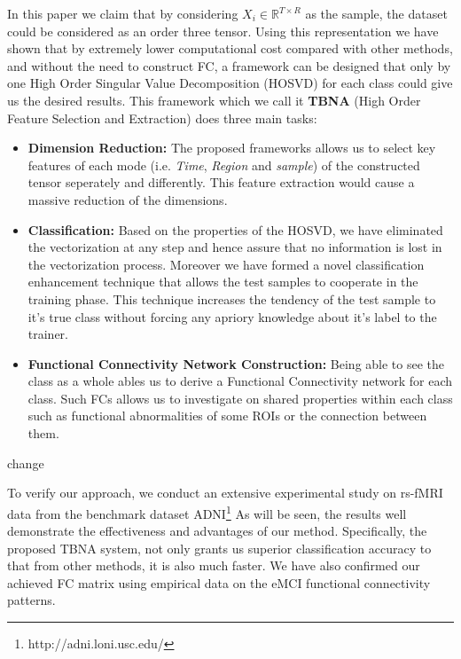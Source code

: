 \documentclass[journal]{IEEEtran}
\begin{document}
	In this paper we claim that by considering $X_i \in \mathbb{R}^ {T \times R}$ as the sample, the dataset could be considered as an order three tensor. Using this representation we have shown that by extremely lower computational cost compared with other methods, and without the need to construct FC, a framework can be designed that only by one High Order Singular Value Decomposition (HOSVD) for each class could give us the desired results. This framework which we call it \textbf{TBNA} (High Order Feature Selection and Extraction) does three main tasks: 
	\begin{itemize}
		\item
		\textbf{Dimension Reduction:}
		The proposed frameworks allows us to select key features of each mode  (i.e. \textit{Time}, \textit{Region} and \textit{sample}) of the constructed tensor seperately and differently. This feature extraction would cause a massive reduction of the dimensions.
		
		\item
		\textbf{Classification:} 
		Based on the properties of the HOSVD, we have eliminated the vectorization at any step and hence assure that no information is lost in the vectorization process. Moreover we have formed a novel  classification enhancement technique that allows the test samples to cooperate in the training phase. This technique increases the tendency of the test sample to it's true class without forcing any apriory knowledge about it's label to the trainer. 
		
		\item
		\textbf{Functional Connectivity Network Construction:}
		Being able to see the class as a whole ables us to derive a Functional Connectivity network for each class. Such FCs allows us to investigate on shared properties within each class such as functional abnormalities of some ROIs or the connection between them.  
		
	\end{itemize}
	
	change
	
	
	
	To verify our approach, we conduct an extensive experimental study on rs-fMRI data from the
	benchmark dataset ADNI\footnote{http://adni.loni.usc.edu/} As will be seen, the results well demonstrate the effectiveness and advantages of our method. Specifically, the proposed TBNA system, not only grants us superior classification accuracy to that from other methods, it is also much faster. We have also confirmed our achieved FC matrix using empirical data on the eMCI functional connectivity patterns.
	
\end{document}
